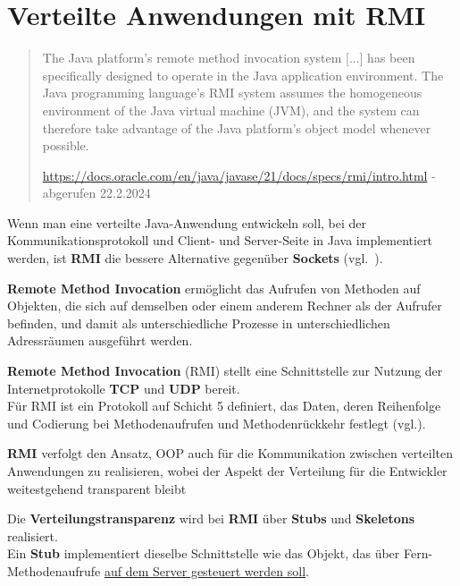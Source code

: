 \section{Verteilte Anwendungen mit RMI}\label{sec:distributedrmiapplications}

\begin{tcolorbox}
\blockquote[{\url{https://docs.oracle.com/en/java/javase/21/docs/specs/rmi/intro.html} - abgerufen 22.2.2024}]{
    The Java platform's remote method invocation system [...] has been specifically designed to operate in the Java application environment. The Java programming language's RMI system assumes the homogeneous environment of the Java virtual machine (JVM), and the system can therefore take advantage of the Java platform's object model whenever possible.
}
\end{tcolorbox}

Wenn man eine verteilte Java-Anwendung entwickeln soll, bei der Kommunikationsprotokoll und Client- und Server-Seite in Java implementiert werden, ist \textbf{RMI} die bessere Alternative gegenüber  \textbf{Sockets} (vgl.~\cite[311]{Oec22}).

\begin{tcolorbox}[enlarge top by=0.5cm,enlarge bottom by=0.5cm]
    \textbf{Remote Method Invocation} ermöglicht das Aufrufen von Methoden auf Objekten, die sich auf demselben oder einem anderem Rechner als der Aufrufer befinden, und damit als unterschiedliche Prozesse in unterschiedlichen Adressräumen ausgeführt werden.
\end{tcolorbox}

\noindent
\textbf{Remote Method Invocation} (RMI) stellt eine Schnittstelle zur Nutzung der Internetprotokolle \textbf{TCP} und \textbf{UDP} bereit.\\
Für RMI ist ein Protokoll auf Schicht 5 definiert, das Daten, deren Reihenfolge und Codierung bei Methodenaufrufen und Methodenrückkehr festlegt (vgl.\cite[402]{Oec22}).

\noindent
\textbf{RMI} verfolgt den Ansatz, OOP auch für die Kommunikation zwischen verteilten Anwendungen zu realisieren, wobei der Aspekt der Verteilung für die Entwickler weitestgehend transparent bleibt


\noindent
Die \textbf{Verteilungstransparenz} wird bei \textbf{RMI} über \textbf{Stubs} und \textbf{Skeletons} realisiert.\\

\noindent
Ein \textbf{Stub} implementiert dieselbe Schnittstelle wie das Objekt, das über Fern-Methodenaufrufe \ul{auf dem Server gesteuert werden soll}.

